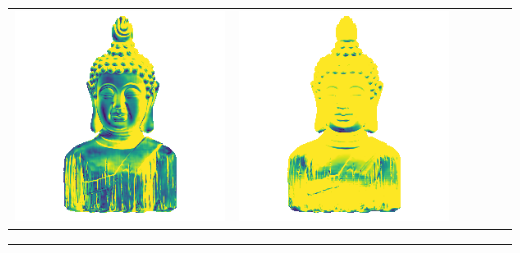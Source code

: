 \begin{center}
\begin{tabularx}{\linewidth}{@{}Y@{}Y@{}Y@{}Y@{}Y@{}Y@{}}
\includegraphics[width=\linewidth]{semisynthetic/20150514_16_marrnet_err.png} &
\includegraphics[width=\linewidth]{semisynthetic/20150514_16_ef_err.png} \\
\end{tabularx}
\begin{center}\rule{0.5\linewidth}{\linethickness}\end{center}


\end{center}
